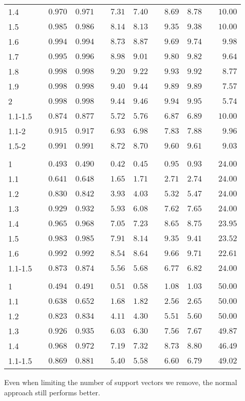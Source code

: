 \documentclass{article}\usepackage[]{graphicx}\usepackage[]{color}
\begin{document}
\begin{table}[H]
\begin{center}
\begin{tabular}{lcrrcrrcrrcr}
1.4&&$0.970$&$0.971$&&$7.31$&$7.40$&&$8.69$&$8.78$&&$10.00$\tabularnewline
1.5&&$0.985$&$0.986$&&$8.14$&$8.13$&&$9.35$&$9.38$&&$10.00$\tabularnewline
1.6&&$0.994$&$0.994$&&$8.73$&$8.87$&&$9.69$&$9.74$&&$ 9.98$\tabularnewline
1.7&&$0.995$&$0.996$&&$8.98$&$9.01$&&$9.80$&$9.82$&&$ 9.64$\tabularnewline
1.8&&$0.998$&$0.998$&&$9.20$&$9.22$&&$9.93$&$9.92$&&$ 8.77$\tabularnewline
1.9&&$0.998$&$0.998$&&$9.40$&$9.44$&&$9.89$&$9.89$&&$ 7.57$\tabularnewline
2&&$0.998$&$0.998$&&$9.44$&$9.46$&&$9.94$&$9.95$&&$ 5.74$\tabularnewline
1.1-1.5&&$0.874$&$0.877$&&$5.72$&$5.76$&&$6.87$&$6.89$&&$10.00$\tabularnewline
1.1-2&&$0.915$&$0.917$&&$6.93$&$6.98$&&$7.83$&$7.88$&&$ 9.96$\tabularnewline
1.5-2&&$0.991$&$0.991$&&$8.72$&$8.70$&&$9.60$&$9.61$&&$ 9.03$\tabularnewline
\hline
&&&&&&&&&&&\tabularnewline
1&&$0.493$&$0.490$&&$0.42$&$0.45$&&$0.95$&$0.93$&&$24.00$\tabularnewline
1.1&&$0.641$&$0.648$&&$1.65$&$1.71$&&$2.71$&$2.74$&&$24.00$\tabularnewline
1.2&&$0.830$&$0.842$&&$3.93$&$4.03$&&$5.32$&$5.47$&&$24.00$\tabularnewline
1.3&&$0.929$&$0.932$&&$5.93$&$6.08$&&$7.62$&$7.65$&&$24.00$\tabularnewline
1.4&&$0.965$&$0.968$&&$7.05$&$7.23$&&$8.65$&$8.75$&&$23.95$\tabularnewline
1.5&&$0.983$&$0.985$&&$7.91$&$8.14$&&$9.35$&$9.41$&&$23.52$\tabularnewline
1.6&&$0.992$&$0.992$&&$8.54$&$8.64$&&$9.66$&$9.71$&&$22.61$\tabularnewline
1.1-1.5&&$0.873$&$0.874$&&$5.56$&$5.68$&&$6.77$&$6.82$&&$24.00$\tabularnewline
\hline
&&&&&&&&&&&\tabularnewline
1&&$0.494$&$0.491$&&$0.51$&$0.58$&&$1.08$&$1.03$&&$50.00$\tabularnewline
1.1&&$0.638$&$0.652$&&$1.68$&$1.82$&&$2.56$&$2.65$&&$50.00$\tabularnewline
1.2&&$0.823$&$0.834$&&$4.11$&$4.30$&&$5.51$&$5.60$&&$50.00$\tabularnewline
1.3&&$0.926$&$0.935$&&$6.03$&$6.30$&&$7.56$&$7.67$&&$49.87$\tabularnewline
1.4&&$0.968$&$0.972$&&$7.19$&$7.32$&&$8.73$&$8.80$&&$46.49$\tabularnewline
1.1-1.5&&$0.869$&$0.881$&&$5.40$&$5.58$&&$6.60$&$6.79$&&$49.02$\tabularnewline
\hline
\end{tabular}
\end{center}
\end{table}




Even when limiting the number of support vectors we remove, the normal approach still performs better.
\end{document}
